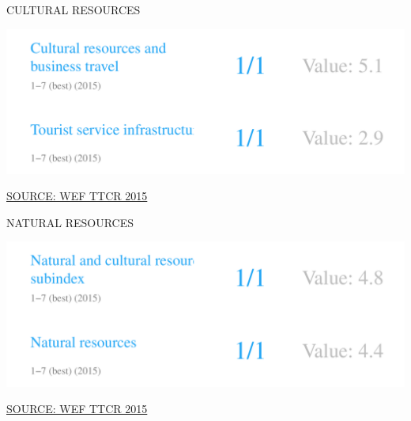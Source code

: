 \documentclass{article}\usepackage[]{graphicx}\usepackage[]{color}
\makeatletter
\def\maxwidth{ %
  \ifdim\Gin@nat@width>\linewidth
    \linewidth
  \else
    \Gin@nat@width
  \fi
}
\makeatother
\begin{document}
\begin{minipage}[c]{0.95\textwidth}
  \vspace{4ex}
  \begin{minipage}[c]{0.5\textwidth}
    \hspace{4ex}\small{\textcolor[HTML]{818181}{CULTURAL RESOURCES}}
    \vspace{1ex}


{\centering \includegraphics[width=\maxwidth]{figure/number1_1-1} 

}



    \hspace{4ex}\scriptsize{\href{NA}{\textcolor[HTML]{FF4023}{SOURCE: WEF TTCR 2015}}}
  \end{minipage}
  \begin{minipage}[c]{0.5\textwidth}
    \hspace{4ex}\small{\textcolor[HTML]{818181}{NATURAL RESOURCES}}
    \vspace{1ex}


{\centering \includegraphics[width=\maxwidth]{figure/number1_2-1} 

}



    \hspace{4ex}\scriptsize{\href{NA}{\textcolor[HTML]{FF4023}{SOURCE: WEF TTCR 2015}}}
  \end{minipage}
\end{minipage}
\end{document}
